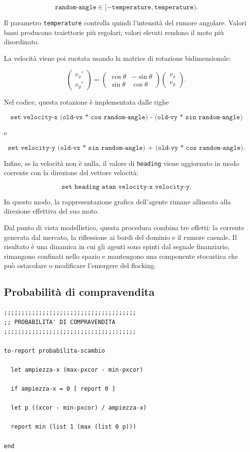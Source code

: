 \[
\texttt{random-angle}
\in
[-\texttt{temperature}, \texttt{temperature}).
\]

Il parametro \texttt{temperature} controlla quindi l'intensità del rumore
angolare. Valori bassi producono traiettorie più regolari; valori elevati
rendono il moto più disordinato.

La velocità viene poi ruotata usando la matrice di rotazione bidimensionale:

\[
\begin{pmatrix}
v_x' \\
v_y'
\end{pmatrix}
=
\begin{pmatrix}
\cos\theta & -\sin\theta \\
\sin\theta & \cos\theta
\end{pmatrix}
\begin{pmatrix}
v_x \\
v_y
\end{pmatrix}.
\]

Nel codice, questa rotazione è implementata dalle righe

\[
\texttt{set velocity-x (old-vx * cos random-angle) - (old-vy * sin random-angle)}
\]

e

\[
\texttt{set velocity-y (old-vx * sin random-angle) + (old-vy * cos random-angle)}.
\]

Infine, se la velocità non è nulla, il valore di \texttt{heading} viene
aggiornato in modo coerente con la direzione del vettore velocità:

\[
\texttt{set heading atan velocity-x velocity-y}.
\]

In questo modo, la rappresentazione grafica dell'agente rimane allineata alla
direzione effettiva del suo moto.

Dal punto di vista modellistico, questa procedura combina tre effetti: la corrente
generata dal mercato, la riflessione ai bordi del dominio e il rumore casuale.
Il risultato è una dinamica in cui gli agenti sono spinti dal segnale finanziario,
rimangono confinati nello spazio e mantengono una componente stocastica che può
ostacolare o modificare l'emergere del flocking.

\subsection{Probabilità di compravendita}

\begin{lstlisting}[caption={Reporter per la probabilità di scambio}]
;;;;;;;;;;;;;;;;;;;;;;;;;;;;;;;;;;;;;;
;; PROBABILITA' DI COMPRAVENDITA
;;;;;;;;;;;;;;;;;;;;;;;;;;;;;;;;;;;;;;

to-report probabilita-scambio

  let ampiezza-x (max-pxcor - min-pxcor)

  if ampiezza-x = 0 [ report 0 ]

  let p ((xcor - min-pxcor) / ampiezza-x)

  report min (list 1 (max (list 0 p)))

end
\end{lstlisting}

